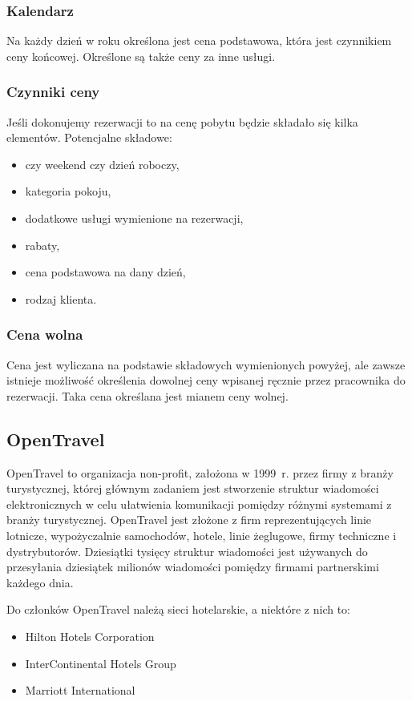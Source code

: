 \documentclass[a4paper,onecolumn,oneside,11pt,wide,floatssmall]{mwrep}
\theoremstyle{definition}
\theoremstyle{plain}%
\theoremstyle{remark}
\begin{document}
\subsubsection{Kalendarz}
Na każdy dzień w roku określona jest cena podstawowa, która jest czynnikiem ceny
końcowej. Określone są także ceny za inne usługi.

\subsubsection{Czynniki ceny}
Jeśli dokonujemy rezerwacji to na cenę pobytu będzie składało się kilka
elementów. Potencjalne składowe:
\begin{itemize}
  \item czy weekend czy dzień roboczy,
  \item kategoria pokoju,
  \item dodatkowe usługi wymienione na rezerwacji,
  \item rabaty,
  \item cena podstawowa na dany dzień,
  \item rodzaj klienta.
\end{itemize}

\subsubsection{Cena wolna}
Cena jest wyliczana na podstawie składowych wymienionych powyżej, ale zawsze
istnieje możliwość określenia dowolnej ceny wpisanej ręcznie przez pracownika
do rezerwacji.
Taka cena określana jest mianem ceny wolnej.

\subsection{OpenTravel}
OpenTravel to organizacja non-profit, założona w \mbox{1999 r.} przez firmy
z branży turystycznej, której głównym zadaniem jest stworzenie struktur
wiadomości elektronicznych w celu ułatwienia komunikacji pomiędzy różnymi systemami z
branży turystycznej. OpenTravel jest złożone z firm reprezentujących linie
lotnicze, wypożyczalnie samochodów, hotele, linie żeglugowe, firmy techniczne i
dystrybutorów. Dziesiątki tysięcy struktur wiadomości jest używanych do
przesyłania dziesiątek milionów wiadomości pomiędzy firmami partnerskimi każdego
dnia.

Do członków OpenTravel należą sieci hotelarskie, a niektóre z nich to:
\begin{itemize}
  \item Hilton Hotels Corporation
  \item InterContinental Hotels Group
  \item Marriott International
\end{itemize}
\end{document}
